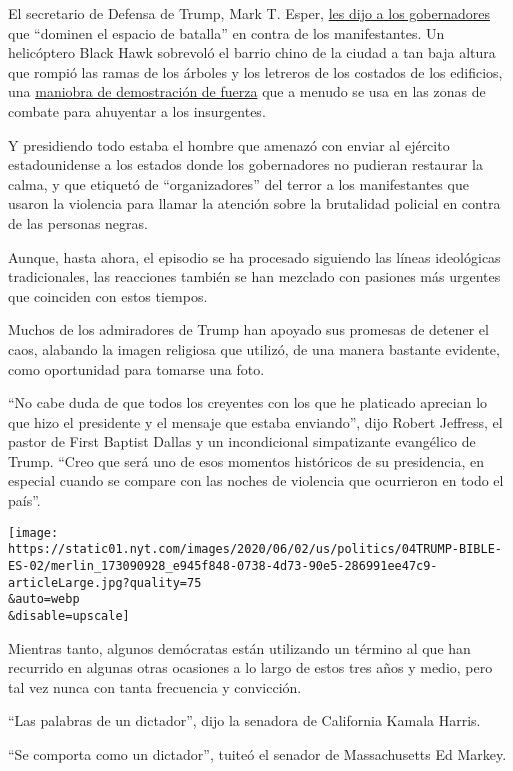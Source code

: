 El secretario de Defensa de Trump, Mark T. Esper,
\href{https://www.nytimes.com/2020/06/01/us/politics/police-military-gear.html}{les
dijo a los gobernadores} que ``dominen el espacio de batalla'' en contra
de los manifestantes. Un helicóptero Black Hawk sobrevoló el barrio
chino de la ciudad a tan baja altura que rompió las ramas de los árboles
y los letreros de los costados de los edificios, una
\href{https://www.nytimes.com/2020/06/02/us/politics/military-national-guard-trump-protests.html}{maniobra
de demostración de fuerza} que a menudo se usa en las zonas de combate
para ahuyentar a los insurgentes.

Y presidiendo todo estaba el hombre que amenazó con enviar al ejército
estadounidense a los estados donde los gobernadores no pudieran
restaurar la calma, y que etiquetó de ``organizadores'' del terror a los
manifestantes que usaron la violencia para llamar la atención sobre la
brutalidad policial en contra de las personas negras.

Aunque, hasta ahora, el episodio se ha procesado siguiendo las líneas
ideológicas tradicionales, las reacciones también se han mezclado con
pasiones más urgentes que coinciden con estos tiempos.

Muchos de los admiradores de Trump han apoyado sus promesas de detener
el caos, alabando la imagen religiosa que utilizó, de una manera
bastante evidente, como oportunidad para tomarse una foto.

``No cabe duda de que todos los creyentes con los que he platicado
aprecian lo que hizo el presidente y el mensaje que estaba enviando'',
dijo Robert Jeffress, el pastor de First Baptist Dallas y un
incondicional simpatizante evangélico de Trump. ``Creo que será uno de
esos momentos históricos de su presidencia, en especial cuando se
compare con las noches de violencia que ocurrieron en todo el país''.

\texttt{[image: https://static01.nyt.com/images/2020/06/02/us/politics/04TRUMP-BIBLE-ES-02/merlin\_173090928\_e945f848-0738-4d73-90e5-286991ee47c9-articleLarge.jpg?quality=75\\\&auto=webp\\\&disable=upscale]}

Mientras tanto, algunos demócratas están utilizando un término al que
han recurrido en algunas otras ocasiones a lo largo de estos tres años y
medio, pero tal vez nunca con tanta frecuencia y convicción.

``Las palabras de un dictador'', dijo la senadora de California Kamala
Harris.

``Se comporta como un dictador'', tuiteó el senador de Massachusetts Ed
Markey.

